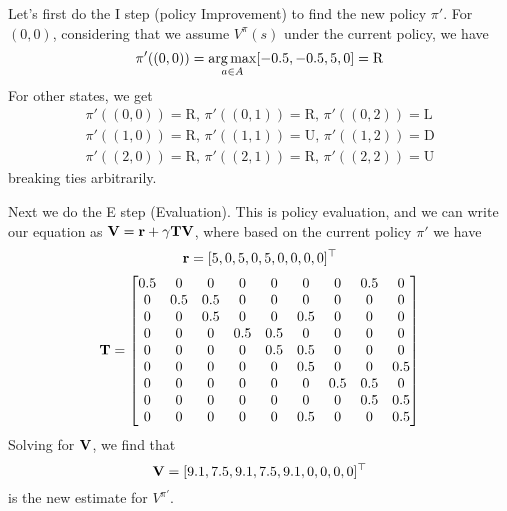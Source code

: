 \documentclass[12pt]{article}
\begin{document}
\noindent {}

\vspace{.5pc}


\begin{solution}
 Let's first do the I step (policy Improvement) to find
the new policy $\pi'$. For $(0,0)$, considering that we assume
$V^\pi(s)$ under the current policy, we have
$$\pi'((0,0)) = \argmax_{a \in A} [ -0.5, -0.5, 5, 0] = \text{R}$$
For other states, we get
\begin{align*}
    \pi'((0,0)) = \text{R}, \,\pi'((0,1)) = \text{R}, \, \pi'((0,2)) = \text{L} \\
    \pi'((1,0)) = \text{R}, \, \pi'((1,1)) = \text{U}, \, \pi'((1,2)) = \text{D} \\
    \pi'((2,0)) = \text{R}, \, \pi'((2,1)) = \text{R}, \, \pi'((2,2)) = \text{U}
\end{align*}
breaking ties arbitrarily.

Next we do the E step (Evaluation). This is policy evaluation, and we can write our equation as $\mathbf{V} = \mathbf{r} + \gamma \mathbf{T} \mathbf{V}$, where
%
based on the current policy $\pi'$ we have
%
$$\mathbf{r} = [5, 0, 5, 0, 5, 0, 0, 0, 0]^\top$$
$$\mathbf{T} = \begin{bmatrix}
0.5 & 0 & 0 & 0 & 0 & 0 & 0 & 0.5 & 0 \\
0 & 0.5 & 0.5 & 0 & 0 & 0 & 0 & 0 & 0 \\
0 & 0 & 0.5 & 0 & 0 & 0.5 & 0 & 0 & 0 \\
0 & 0 & 0 & 0.5 & 0.5 & 0 & 0 & 0 & 0 \\
0 & 0 & 0 & 0 & 0.5 & 0.5 & 0 & 0 & 0 \\
0 & 0 & 0 & 0 & 0 & 0.5 & 0 & 0 & 0.5 \\
0 & 0 & 0 & 0 & 0 & 0 & 0.5 & 0.5 & 0 \\
0 & 0 & 0 & 0 & 0 & 0 & 0 & 0.5 & 0.5 \\
0 & 0 & 0 & 0 & 0 & 0.5 & 0 & 0 & 0.5 \\
\end{bmatrix}$$
Solving for $\mathbf{V}$, we find that
$$\mathbf{V} = [9.1, 7.5, 9.1, 7.5, 9.1, 0, 0, 0, 0]^\top$$
is the new estimate for $V^{\pi'}$.
\end{solution}

\vspace{.5pc}
\end{document}
